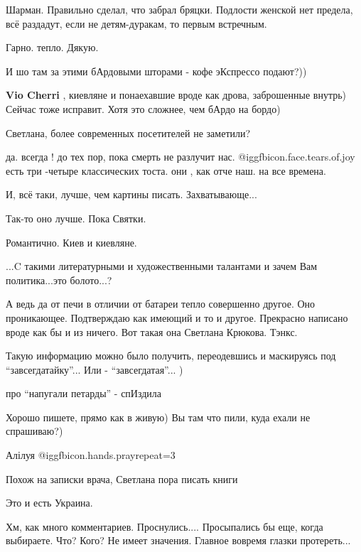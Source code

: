 \begin{itemize}
Шарман. Правильно сделал, что забрал бряцки. Подлости женской нет предела, всё раздадут, если не детям-дуракам, то первым встречным.

Гарно. тепло.
Дякую.

И шо там за этими бАрдовыми шторами - кофе эКспрессо подают?))

\textbf{Vio Cherri} , киевляне и понаехавшие вроде как дрова, заброшенные внутрь) Сейчас тоже исправит. Хотя это сложнее, чем бАрдо на бордо)

Светлана, более современных посетителей не заметили?

да. всегда ! до тех пор, пока смерть не разлучит нас.  @igg{fbicon.face.tears.of.joy}  есть три -четыре классических тоста. они , как отче наш. на все времена.

И, всё таки, лучше, чем картины писать.
Захватывающе...

Так-то оно лучше. Пока Святки.

Романтично. Киев и киевляне.

...C такими литературными и художественными талантами и зачем Вам политика...это болото...?


А ведь да от печи в отличии от батареи тепло совершенно другое. Оно
проникающее. Подтверждаю как имеющий и то и другое. Прекрасно написано вроде
как бы и из ничего. Вот такая она Светлана Крюкова. Тэнкс.


Такую информацию можно было получить, переодевшись и маскируясь под
\enquote{завсегдатайку}... Или - \enquote{завсегдатая}... )

про \enquote{напугали петарды} - спИздила

Хорошо пишете, прямо как в живую)
Вы там что пили, куда ехали не спрашиваю?)

Алілуя  @igg{fbicon.hands.pray}{repeat=3} 

Похож на записки врача, Светлана пора писать книги

Это и есть Украина.

Хм, как много комментариев. Проснулись.... Просыпались бы еще, когда выбираете. Что? Кого? Не имеет значения. Главное вовремя глазки протереть...


\end{itemize}
